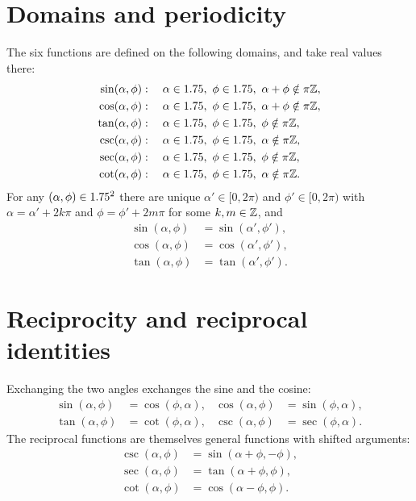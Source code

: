 \section{Domains and periodicity}\label{app:gs-domains}

The six functions are defined on the following domains, and take real values there:
\begin{align}
\sin(\alpha, \phi)&: \quad \alpha \in 1.75, \ \phi \in 1.75, \ \alpha + \phi \notin \pi\mathbb{Z}, \\
\cos(\alpha, \phi)&: \quad \alpha \in 1.75, \ \phi \in 1.75, \ \alpha + \phi \notin \pi\mathbb{Z}, \\
\tan(\alpha, \phi)&: \quad \alpha \in 1.75, \ \phi \in 1.75, \ \phi \notin \pi\mathbb{Z}, \\
\csc(\alpha, \phi)&: \quad \alpha \in 1.75, \ \phi \in 1.75, \ \alpha \notin \pi\mathbb{Z}, \\
\sec(\alpha, \phi)&: \quad \alpha \in 1.75, \ \phi \in 1.75, \ \phi \notin \pi\mathbb{Z}, \\
\cot(\alpha, \phi)&: \quad \alpha \in 1.75, \ \phi \in 1.75, \ \alpha \notin \pi\mathbb{Z}.
\end{align}
For any $(\alpha, \phi) \in 1.75^2$ there are unique $\alpha' \in [0, 2\pi)$ and $\phi' \in [0, 2\pi)$ with $\alpha = \alpha' + 2k\pi$ and $\phi = \phi' + 2m\pi$ for some $k, m \in \mathbb{Z}$, and
\begin{align}
\sin(\alpha, \phi) &= \sin(\alpha', \phi'), \\
\cos(\alpha, \phi) &= \cos(\alpha', \phi'), \\
\tan(\alpha, \phi) &= \tan(\alpha', \phi').
\end{align}

\section{Reciprocity and reciprocal identities}\label{app:gs-reciprocity}

Exchanging the two angles exchanges the sine and the cosine:
\begin{align}
\sin(\alpha, \phi) &= \cos(\phi, \alpha), & \cos(\alpha, \phi) &= \sin(\phi, \alpha), \\
\tan(\alpha, \phi) &= \cot(\phi, \alpha), & \csc(\alpha, \phi) &= \sec(\phi, \alpha).
\end{align}
The reciprocal functions are themselves general functions with shifted arguments:
\begin{align}
\csc(\alpha, \phi) &= \sin(\alpha + \phi, -\phi), \\
\sec(\alpha, \phi) &= \tan(\alpha + \phi, \phi), \\
\cot(\alpha, \phi) &= \cos(\alpha - \phi, \phi).
\end{align}

